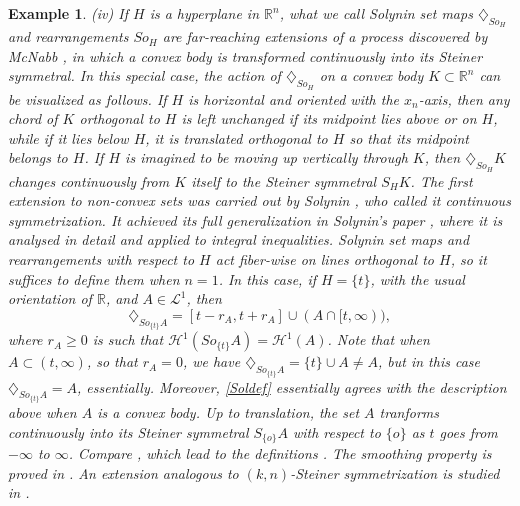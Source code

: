 \documentclass[12pt,reqno]{amsart}
\newcommand{\R}{{\mathbb R}}
\newcommand{\cH}{{\mathcal H}}
\newcommand{\cL}{\mathcal L}
\newtheorem{ex}[thm]{Example}
\newcommand{\di}{\diamondsuit}
\numberwithin{equation}{section}
\begin{document}
\begin{ex}
{(iv) If $H$ is a hyperplane in $\R^n$, what we call {\em Solynin} set maps $\di_{So_H}$ and rearrangements $So_H$ are
far-reaching extensions of a process discovered by McNabb \cite{McN}, in which a convex body is transformed continuously into its Steiner symmetral.  In this special case, the action of $\di_{So_H}$ on a convex body $K\subset\R^n$ can be visualized as follows.  If $H$ is horizontal and oriented with the $x_n$-axis, then any chord of $K$ orthogonal to $H$ is left unchanged if its midpoint lies above or on $H$, while if it lies below $H$, it is translated orthogonal to $H$ so that its midpoint belongs to $H$.  If $H$ is imagined to be moving up vertically through $K$, then $\di_{So_H} K$ changes continuously from $K$ itself to the Steiner symmetral $S_HK$.  The first extension to non-convex sets was carried out by Solynin \cite{Sol90}, who called it {\em continuous symmetrization}.  It achieved its full generalization in Solynin's paper \cite{Sol1}, where it is analysed in detail and applied to integral inequalities.  Solynin set maps and rearrangements with respect to $H$ act fiber-wise on lines orthogonal to $H$, so it suffices to define them when $n=1$.  In this case, if $H=\{t\}$, with the usual orientation of $\R$, and $A\in {\cL}^1$, then
\begin{equation}\label{Soldef}
\di_{So_{\{t\}} A}=[t-r_A,t+r_A]\cup (A\cap[t,\infty)),
\end{equation}
where $r_A\geq0$ is such that ${\cH}^1(So_{\{t\}} A)={\cH}^1(A)$.  Note that when $A\subset (t,\infty)$, so that $r_A=0$, we  have $\di_{So_{\{t\}} A}=\{t\}\cup A\neq A$, but in this case $\di_{So_{\{t\}} A}=A$, essentially.  Moreover, \eqref{Soldef} essentially agrees with the description above when $A$ is a convex body.  Up to translation, the set $A$ tranforms continuously into its Steiner symmetral $S_{\{o\}}A$ with respect to $\{o\}$ as $t$ goes from $-\infty$ to $\infty$. Compare \cite[(4.5) and (4.6)]{Sol1}, which lead to the definitions
\cite[Definitions~4.3 and~4.4]{Sol1}. The smoothing property is proved in \cite[Lemma~4.4]{Sol1}. An extension analogous to $(k,n)$-Steiner symmetrization is studied in \cite[Section~9]{Sol1}.

}
\end{ex}
\end{document}
